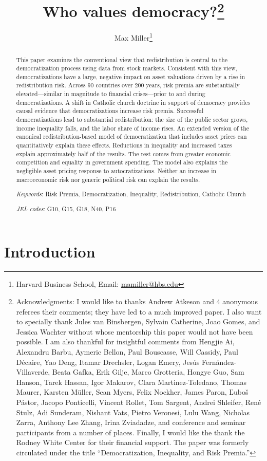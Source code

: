 \documentclass[12pt]{article}
\title{Who values democracy?\thanks{Acknowledgments: I would like to thanks Andrew Atkeson and 4 anonymous referees their comments; they have led to a much improved paper.  I also want to specially thank Jules van Binsbergen, Sylvain Catherine, Joao Gomes, and Jessica Wachter without whose mentorship this paper would not have been possible. I am also thankful for insightful comments from Hengjie Ai, Alexandru Barbu, Aymeric Bellon, Paul Bouscasse, Will Cassidy, Paul D\'{e}caire, Yao Deng,  Itamar Drechsler, Logan Emery, Jes\'{u}s Fern\'{a}ndez-Villaverde,  Beata Gafka, Erik Gilje,  Marco Grotteria, Hongye Guo, Sam Hanson, Tarek Hassan, Igor Makarov, Clara Martinez-Toledano, Thomas Maurer, Karsten M\"{u}ller, Sean Myers, Felix Nockher, James Paron, \v{L}ubo\v{s} P\'{a}stor,  Jacopo Ponticelli, Vincent Rollet, Tom Sargent, Andrei Shleifer, Ren\'{e} Stulz, Adi Sunderam, Nishant Vats, Pietro Veronesi, Lulu Wang, Nicholas Zarra, Anthony Lee Zhang, Irina Zviadadze, and conference and seminar participants from a number of places. Finally, I would like the thank the Rodney White Center for their financial support. The paper was formerly circulated under the title ``Democratization, Inequality, and Risk Premia.''}}
\author{Max Miller\thanks{Harvard Business School, Email: \href{mailto:mamiller@hbs.edu}{mamiller@hbs.edu}}	
}
\numberwithin{equation}{section}
\begin{document}
\hypersetup{linkcolor=blue}
\maketitle

\thispagestyle{empty}

	 \vspace{-1cm}

\begin{abstract}

\noindent This paper examines the conventional view that redistribution is central to the democratization process using data from stock markets. Consistent with this view,  democratizations have a large, negative impact on asset valuations driven by a rise in redistribution risk. Across 90 countries over 200 years, risk premia are substantially elevated---similar in magnitude to financial crises---prior to and during democratizations. A shift in Catholic church doctrine in support of democracy provides causal evidence that democratizations increase risk premia. Successful democratizations lead to substantial redistribution: the size of the public sector grows, income inequality falls, and the labor share of income rises.  An extended version of the canonical redistribution-based model of democratization that includes asset prices can quantitatively explain these effects. Reductions in inequality and increased taxes explain approximately half of the results. The rest comes from greater economic competition and equality in government spending. The model also explains the negligible asset pricing response to autocratizations. Neither an increase in macroeconomic risk nor generic political risk can explain the results.

	\vspace{1cm}
	
	\noindent \textit{Keywords}: Risk Premia, Democratization, Inequality, Redistribution, Catholic Church
	
	\noindent \textit{JEL codes}: G10, G15, G18, N40, P16
	
\end{abstract}

\renewcommand{\baselinestretch}{1.3}\normalsize
\newpage
\clearpage
{}

\newpage


\section{Introduction}
 
\end{document}
